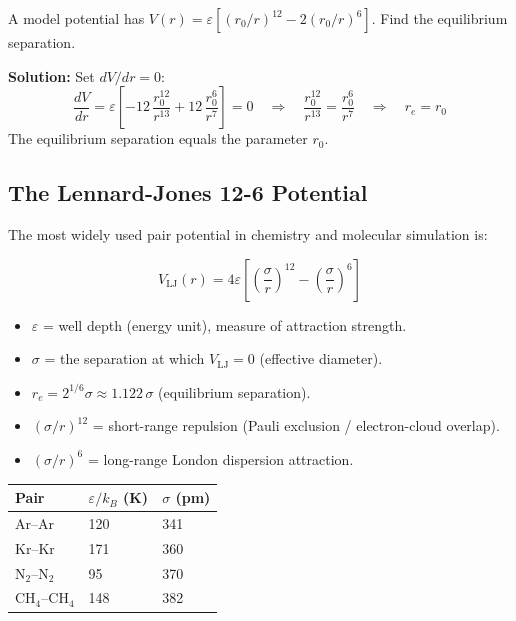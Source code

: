 \documentclass[12pt,a4paper]{article}
\begin{document}
\begin{tcolorbox}[examplebox, title={Solved Example: Equilibrium Separation}]
A model potential has $V(r)=\varepsilon\left[(r_0/r)^{12}-2(r_0/r)^6\right]$. Find the equilibrium separation.

\textbf{Solution:} Set $dV/dr = 0$:
\[
\frac{dV}{dr}=\varepsilon\left[-12\,\frac{r_0^{12}}{r^{13}}+12\,\frac{r_0^{6}}{r^{7}}\right]=0
\quad\Rightarrow\quad \frac{r_0^{12}}{r^{13}}=\frac{r_0^{6}}{r^{7}}
\quad\Rightarrow\quad r_e = r_0
\]
The equilibrium separation equals the parameter $r_0$.
\end{tcolorbox}

\subsection{The Lennard-Jones 12-6 Potential}
The most widely used pair potential in chemistry and molecular simulation is:

\begin{tcolorbox}[formulabox, title={Lennard-Jones (12-6) Potential}]
\[
V_{\mathrm{LJ}}(r) = 4\varepsilon\!\left[\left(\frac{\sigma}{r}\right)^{12}-\left(\frac{\sigma}{r}\right)^{6}\right]
\]
\begin{itemize}[leftmargin=*, itemsep=1pt, topsep=2pt]
  \item $\varepsilon$ = well depth (energy unit), measure of attraction strength.
  \item $\sigma$ = the separation at which $V_{\mathrm{LJ}}=0$ (effective diameter).
  \item $r_e = 2^{1/6}\sigma \approx 1.122\,\sigma$ (equilibrium separation).
  \item $(\sigma/r)^{12}$ = short-range repulsion (Pauli exclusion / electron-cloud overlap).
  \item $(\sigma/r)^{6}$ = long-range London dispersion attraction.
\end{itemize}
\end{tcolorbox}

\begin{tabularx}{\linewidth}{|B{2.4cm}|Y|Y|}
\hline
\textbf{Pair} & \textbf{$\varepsilon/k_B$ (K)} & \textbf{$\sigma$ (pm)} \\
\hline
Ar--Ar & 120 & 341 \\
\hline
Kr--Kr & 171 & 360 \\
\hline
$\mathrm{N_2}$--$\mathrm{N_2}$ & 95 & 370 \\
\hline
$\mathrm{CH_4}$--$\mathrm{CH_4}$ & 148 & 382 \\
\hline
\end{tabularx}
\end{document}
